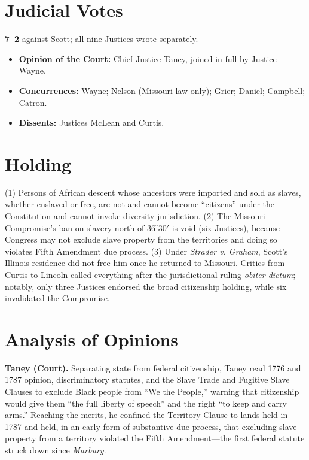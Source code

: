 \documentclass[12pt]{article}
\begin{document}
\section{Judicial Votes}

\textbf{7--2} against Scott; all nine Justices wrote separately.
\begin{itemize}
\item \textbf{Opinion of the Court:} Chief Justice Taney, joined in full by Justice Wayne.
\item \textbf{Concurrences:} Wayne; Nelson (Missouri law only); Grier; Daniel; Campbell; Catron.
\item \textbf{Dissents:} Justices McLean and Curtis.
\end{itemize}

\section{Holding}

(1) Persons of African descent whose ancestors were imported and sold as slaves, whether enslaved or free, are not and cannot become ``citizens'' under the Constitution and cannot invoke diversity jurisdiction. (2) The Missouri Compromise's ban on slavery north of $36^{\circ}30'$ is void (six Justices), because Congress may not exclude slave property from the territories and doing so violates Fifth Amendment due process. (3) Under \textit{Strader v. Graham}, Scott's Illinois residence did not free him once he returned to Missouri. Critics from Curtis to Lincoln called everything after the jurisdictional ruling \textit{obiter dictum}; notably, only three Justices endorsed the broad citizenship holding, while six invalidated the Compromise.

\section{Analysis of Opinions}

\textbf{Taney (Court).} Separating state from federal citizenship, Taney read 1776 and 1787 opinion, discriminatory statutes, and the Slave Trade and Fugitive Slave Clauses to exclude Black people from ``We the People,'' warning that citizenship would give them ``the full liberty of speech'' and the right ``to keep and carry arms.'' Reaching the merits, he confined the Territory Clause to lands held in 1787 and held, in an early form of substantive due process, that excluding slave property from a territory violated the Fifth Amendment---the first federal statute struck down since \textit{Marbury}.
\end{document}
